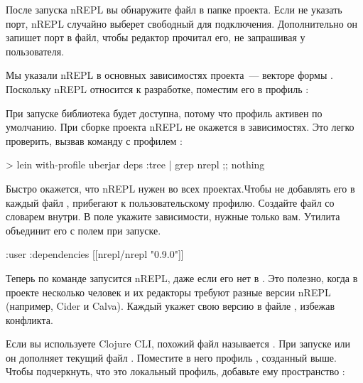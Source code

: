 После запуска nREPL вы обнаружите файл  в папке проекта. Если не указать порт, nREPL случайно выберет свободный для подключения. Дополнительно он запишет порт в файл, чтобы редактор прочитал его, не запрашивая у пользователя.

Мы указали nREPL в основных зависимостях проекта~--- векторе  формы . Поскольку nREPL относится к разработке, поместим его в профиль :

\begin{english}
  \begin{clojure}
:profiles
{:dev
  {:dependencies
    [[nrepl/nrepl "0.9.0"]]}
  \end{clojure}
\end{english}

При запуске  библиотека будет доступна, потому что профиль  активен по умолчанию. При сборке проекта nREPL не окажется в зависимостях. Это легко проверить, вызвав команду  с профилем :

\begin{english}
  \begin{bash}
> lein with-profile uberjar deps :tree | grep nrepl
;; nothing
  \end{bash}
\end{english}

Быстро окажется, что nREPL нужен во всех проектах.Чтобы не добавлять его в каждый файл , прибегают к пользовательскому профилю. Создайте файл  со словарем внутри. В поле  укажите зависимости, нужные только вам. Утилита  объединит его с полем  при запуске.

\begin{english}
  \begin{clojure}
{:user
  {:dependencies
    [[nrepl/nrepl "0.9.0"]]}}
  \end{clojure}
\end{english}

Теперь по команде  запусится nREPL, даже если его нет в . Это полезно, когда в проекте несколько человек и их редакторы требуют разные версии nREPL (например, Cider и Calva). Каждый укажет свою версию в файле , избежав конфликта.

Если вы используете Clojure CLI, похожий файл называется . При запуске  или  он дополняет текущий файл . Поместите в него профиль , созданный выше. Чтобы подчеркнуть, что это локальный профиль, добавьте ему пространство :

